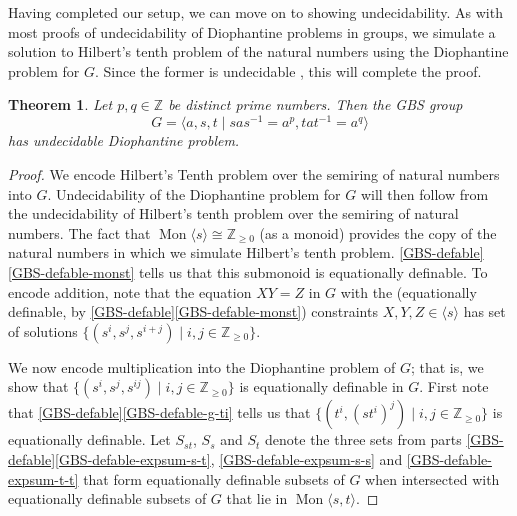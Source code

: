 \documentclass[11pt]{amsart}
\newtheorem{theorem}{Theorem}[section]
\theoremstyle{definition}
\numberwithin{theorem}{section}
\DeclareMathOperator{\Mon}{Mon}
\newcommand{\N}{\mathbb{Z}_{\geq 0}}
\begin{document}
	Having completed our setup, we can move on to showing undecidability. As
	with most proofs of undecidability of Diophantine problems in groups, we
	simulate a solution to Hilbert's tenth problem of the natural numbers using
	the Diophantine problem for \(G\). Since the former is undecidable
	\cite{Matijasevic}, this will complete the proof.
	\begin{theorem}
			\label{GBS-thm}
		Let \(p, q \in \mathbb{Z}\) be distinct prime numbers. Then the GBS group
		\[
			G = \langle a, s, t \mid sas^{-1} = a^p, tat^{-1} = a^q \rangle
		\]
		has undecidable Diophantine problem.
	\end{theorem}

	\begin{proof}
		We encode Hilbert's Tenth problem over the semiring of natural numbers
		into \(G\).  Undecidability of the Diophantine problem for \(G\) will
		then follow from the undecidability of Hilbert's tenth problem over the
		semiring of natural numbers. The fact that \(\Mon\langle s \rangle
		\cong \N\) (as a monoid) provides the copy of the natural numbers in
		which we simulate Hilbert's tenth problem.  \cref{GBS-defable}\eqref{GBS-defable-monst} tells us
		that this submonoid is equationally definable. To encode addition, note
		that the equation \(XY =Z\) in \(G\) with the (equationally definable,
		by \cref{GBS-defable}\eqref{GBS-defable-monst}) constraints \(X, Y, Z \in \langle s \rangle\)
		has set of solutions \(\{(s^i, s^j, s^{i + j}) \mid i, j \in \N\}\).

		We now encode multiplication into the Diophantine problem of \(G\);
		that is, we show that \(\{(s^i, s^j, s^{ij}) \mid i, j \in \N\}\) is
		equationally definable in \(G\). First note that
		\cref{GBS-defable}\eqref{GBS-defable-g-ti} tells us that \(\{(t^i,
		(st^i)^j) \mid i, j \in \N\}\) is equationally definable. Let
		\(S_{st}\), \(S_s\) and \(S_t\) denote the three sets from parts
		\cref{GBS-defable}\eqref{GBS-defable-expsum-s-t},
		\eqref{GBS-defable-expsum-s-s} and \eqref{GBS-defable-expsum-t-t} that
		form equationally definable subsets of \(G\) when intersected with
		equationally definable subsets of \(G\) that lie in \(\Mon\langle s, t
		\rangle\). 


\end{proof}
\end{document}
